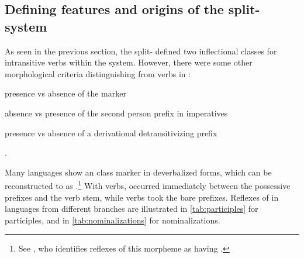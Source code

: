 \subsection{Defining features and origins of the split- system}
\label{sec:split}
As seen in the previous section, the split- defined two inflectional classes for intransitive verbs within the \setone system.
%
%
However, there were some other morphological criteria distinguishing  from  verbs in \PC:
\begin{inlinelist}
\item presence vs absence of the  marker 
\item absence vs presence of the second person prefix  in imperatives
\item presence vs absence of a derivational detransitivizing prefix
\end{inlinelist}.

Many languages show an  class marker in deverbalized forms, which can be reconstructed to \PC as .\footnote{See \textcite[227]{meira2000split}, who identifies reflexes of this morpheme as having .}
With  verbs,  occurred immediately between the possessive prefixes and the verb stem, while  verbs took the bare prefixes.
Reflexes of  in languages from different branches are illustrated in \cref{tab:participles} for participles, and in \cref{tab:nominalizations} for nominalizations.

